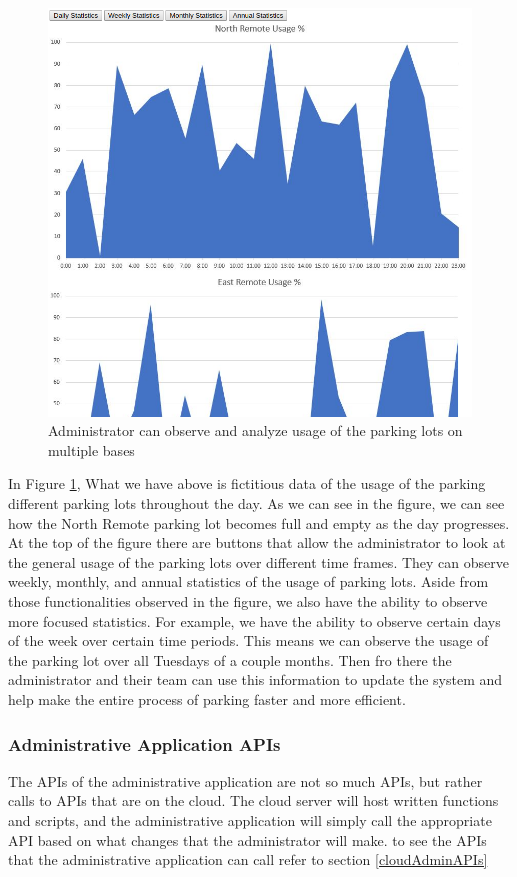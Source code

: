 \documentclass[paper=a4, fontsize=12pt]{scrartcl}
\numberwithin{equation}{section}		%
\numberwithin{figure}{section}			%
\numberwithin{table}{section}				%
\begin{document}
\begin{figure}[!htb]
\centering
\includegraphics[width=13cm]{adminAppPics/statsPage.png}
\caption{Administrator can observe and analyze usage of the parking lots on multiple bases}
\label{adminStats}
\end{figure}

In Figure \ref{adminStats}, What we have above is fictitious data of the usage of the parking different parking lots throughout the day. As we can see in the figure, we can see how the North Remote parking lot becomes full and empty as the day progresses. At the top of the figure there are buttons that allow the administrator to look at the general usage of the parking lots over different time frames. They can observe weekly, monthly, and annual statistics of the usage of parking lots. Aside from those functionalities observed in the figure, we also have the ability to observe more focused statistics. For example, we have the ability to observe certain days of the week over certain time periods. This means we can observe the usage of the parking lot over all Tuesdays of a couple months. Then fro there the administrator and their team can use this information to update the system and help make the entire process of parking faster and more efficient.\\

\subsubsection{Administrative Application APIs}
The APIs of the administrative application are not so much APIs, but rather calls to APIs that are on the cloud. The cloud server will host written functions and scripts, and the administrative application will simply call the appropriate API based on what changes that the administrator will make. to see the APIs that the administrative application can call refer to section \ref{cloudAdminAPIs}\\
\end{document}
